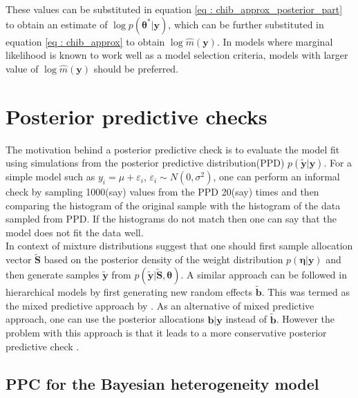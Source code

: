 These values can be substituted in equation \ref{eq : chib_approx_posterior_part} to obtain an estimate of $\log{p(\boldsymbol{\theta}^*|\boldsymbol{y})}$, which can be further substituted in equation \ref{eq : chib_approx} to obtain $\log{\hat{m}(\boldsymbol{y})}$. In models where marginal likelihood is known to work well as a model selection criteria, models with larger value of $\log{\hat{m}(\boldsymbol{y})}$ should be preferred.

\section{Posterior predictive checks}
\label{sec : ppc}
The motivation behind a posterior predictive check is to evaluate the model fit using simulations from the posterior predictive distribution(PPD) $p(\boldsymbol{\tilde{y}}|\boldsymbol{y})$. For a simple model such as $y_i = \mu + \varepsilon_i$, $\varepsilon_i \sim N(0, \sigma^2)$, one can perform an informal check by sampling 1000(say) values from the PPD 20(say) times and then comparing the histogram of the original sample with the histogram of the data sampled from PPD. If the histograms do not match then one can say that the model does not fit the data well.\\

In context of mixture distributions \citet{fruhwirth-schnatter_finite_2013} suggest that one should first sample allocation vector $\boldsymbol{\tilde{S}}$ based on the posterior density of the weight distribution $p(\boldsymbol{\eta}|\boldsymbol{y})$ and then generate samples $\boldsymbol{\tilde{y}}$ from $p(\boldsymbol{\tilde{y}}|\boldsymbol{\tilde{S}}, \boldsymbol{\theta})$. A similar approach can be followed in hierarchical models by first generating new random effects $\boldsymbol{\tilde{b}}$. This was termed as the mixed predictive approach by \citet{marshall_approximate_2003}. As an alternative of mixed predictive approach, one can use the posterior allocations $\boldsymbol{b}|\boldsymbol{y}$ instead of $\boldsymbol{\tilde{b}}$. However the problem with this approach is that it leads to a more conservative posterior predictive check \citep{congdon_applied_2010}.\\

\subsection{PPC for the Bayesian heterogeneity model}
\label{subsec : ppc_bhtge}
